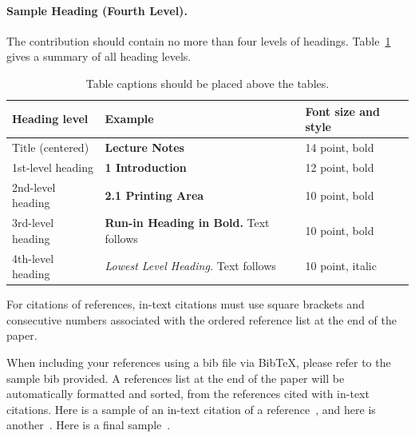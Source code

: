 \documentclass[runningheads]{llncs}
\begin{document}
\paragraph{Sample Heading (Fourth Level).}
The contribution should contain no more than four levels of
headings. Table~\ref{tab1} gives a summary of all heading levels.

\begin{table}
\caption{Table captions should be placed above the
tables.}\label{tab1}
\begin{tabular}{|l|l|l|}
\hline
Heading level &  Example & Font size and style\\
\hline
Title (centered) &  {\Large\bfseries Lecture Notes} & 14 point, bold\\
1st-level heading &  {\large\bfseries 1 Introduction} & 12 point, bold\\
2nd-level heading & {\bfseries 2.1 Printing Area} & 10 point, bold\\
3rd-level heading & {\bfseries Run-in Heading in Bold.} Text follows & 10 point, bold\\
4th-level heading & {\itshape Lowest Level Heading.} Text follows & 10 point, italic\\
\hline
\end{tabular}
\end{table}

For citations of references, in-text citations must use square brackets
and consecutive numbers associated with the ordered reference list at 
the end of the paper.

When including your references using a bib file via BibTeX, please refer to
the sample bib provided. A references list at the end of the paper will be
automatically formatted and sorted, from the references cited with in-text 
citations. Here is a sample of an in-text citation of a reference~\cite{sample1}, 
and here is another~\cite{sample2}. 
Here is a final sample~\cite{sample3,sample4,sample5}.
\end{document}
